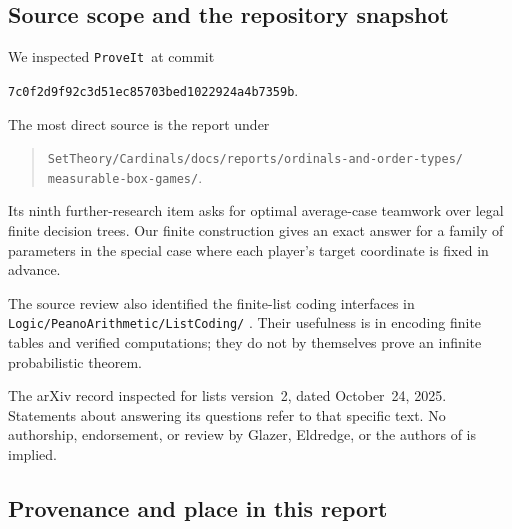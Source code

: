 \documentclass[11pt,letterpaper]{article}
\theoremstyle{definition}
\newcommand{\repo}{\texttt{ProveIt}}
\begin{document}
\subsection{Source scope and the repository snapshot}

We inspected \repo\ at commit
\begin{center}
\small\texttt{7c0f2d9f92c3d51ec85703bed1022924a4b7359b}.
\end{center}
The most direct source is the report under
\begin{quote}\small
\texttt{SetTheory/Cardinals/docs/reports/ordinals-and-order-types/}\\
\texttt{measurable-box-games/}.
\end{quote}
Its ninth further-research item asks for optimal average-case teamwork
over legal finite decision trees. Our finite construction gives an exact
answer for a family of parameters in the special case where each
player's target coordinate is fixed in advance.

The source review also identified the finite-list coding interfaces in
\nolinkurl{Logic/PeanoArithmetic/ListCoding/} \cite{hat:ProveItCoding}.
Their usefulness is in
encoding finite tables and verified computations; they do not by
themselves prove an infinite probabilistic theorem.

The arXiv record inspected for \cite{hat:Eldredge} lists version~2, dated
October~24, 2025. Statements about answering its questions refer to that
specific text. No authorship, endorsement, or review by Glazer,
Eldredge, or the authors of \cite{hat:EMV} is implied.

\subsection{Provenance and place in this report}
\label{mbg:hat:sec:provenance}
\end{document}
